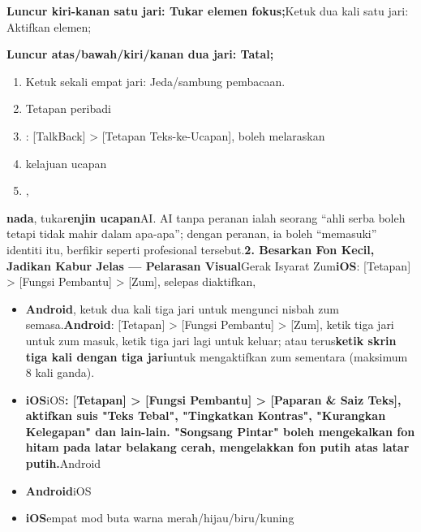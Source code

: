 \begin{tcbinfo}{}
\textbf{Luncur kiri-kanan satu jari: Tukar elemen fokus;}Ketuk dua kali satu jari: Aktifkan elemen;

\textbf{Luncur atas/bawah/kiri/kanan dua jari: Tatal;}

\begin{enumerate}
  \item Ketuk sekali empat jari: Jeda/sambung pembacaan.
  \item Tetapan peribadi
  \item : [TalkBack] > [Tetapan Teks-ke-Ucapan], boleh melaraskan
  \item kelajuan ucapan
  \item ,
\end{enumerate}

\textbf{nada}, tukar\textbf{enjin ucapan}AI. AI tanpa peranan ialah seorang “ahli serba boleh tetapi tidak mahir dalam apa-apa”; dengan peranan, ia boleh “memasuki” identiti itu, berfikir seperti profesional tersebut.\textbf{2. Besarkan Fon Kecil, Jadikan Kabur Jelas — Pelarasan Visual}Gerak Isyarat Zum\textbf{iOS}: [Tetapan] > [Fungsi Pembantu] > [Zum], selepas diaktifkan,

\end{tcbinfo}



\begin{itemize}
  \item \textbf{Android}, ketuk dua kali tiga jari untuk mengunci nisbah zum semasa.\textbf{Android}: [Tetapan] > [Fungsi Pembantu] > [Zum], ketik tiga jari untuk zum masuk, ketik tiga jari lagi untuk keluar; atau terus\textbf{ketik skrin tiga kali dengan tiga jari}untuk mengaktifkan zum sementara (maksimum 8 kali ganda).
  \item \textbf{iOS}iOS\textbf{: [Tetapan] > [Fungsi Pembantu] > [Paparan \& Saiz Teks], aktifkan suis "Teks Tebal", "Tingkatkan Kontras", "Kurangkan Kelegapan" dan lain-lain. "Songsang Pintar" boleh mengekalkan fon hitam pada latar belakang cerah, mengelakkan fon putih atas latar putih.}Android
\end{itemize}


\begin{itemize}
  \item \textbf{Android}iOS
  \item \textbf{iOS}empat mod buta warna merah/hijau/biru/kuning
\end{itemize}

